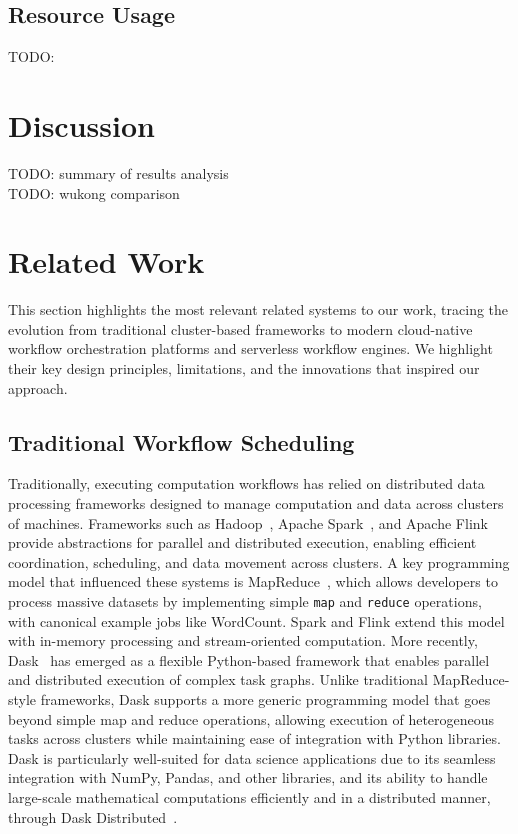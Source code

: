 \documentclass[conference]{IEEEtran}
\begin{document}
\subsection{Resource Usage}
TODO: 

\section{Discussion}
TODO: summary of results analysis\\
TODO: wukong comparison\\


\section{Related Work}
\label{s:related_work}

This section highlights the most relevant related systems to our work, tracing the evolution from traditional cluster-based frameworks to modern cloud-native workflow orchestration platforms and serverless workflow engines. We highlight their key design principles, limitations, and the innovations that inspired our approach.

\subsection{Traditional Workflow Scheduling}
Traditionally, executing computation workflows has relied on distributed data processing frameworks designed to manage computation and data across clusters of machines. Frameworks such as Hadoop~\cite{apache_hadoop}, Apache Spark~\cite{apache_spark}, and Apache Flink~\cite{apache_flink} provide abstractions for parallel and distributed execution, enabling efficient coordination, scheduling, and data movement across clusters. A key programming model that influenced these systems is MapReduce~\cite{mapreduce}, which allows developers to process massive datasets by implementing simple \texttt{map} and \texttt{reduce} operations, with canonical example jobs like WordCount. Spark and Flink extend this model with in-memory processing and stream-oriented computation. More recently, Dask~\cite{dask_python} has emerged as a flexible Python-based framework that enables parallel and distributed execution of complex task graphs. Unlike traditional MapReduce-style frameworks, Dask supports a more generic programming model that goes beyond simple map and reduce operations, allowing execution of heterogeneous tasks across clusters while maintaining ease of integration with Python libraries. Dask is particularly well-suited for data science applications due to its seamless integration with NumPy, Pandas, and other libraries, and its ability to handle large-scale mathematical computations efficiently and in a distributed manner, through Dask Distributed~\cite{dask_python_distributed}.
\end{document}
